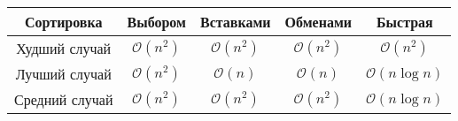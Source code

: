 \begin{tabular}{|c|c|c|c|c|}
    \hline
     Сортировка & Выбором & Вставками & Обменами & Быстрая \\
     \hline
     Худший случай & $\mathcal{O}(n^2)$ & $\mathcal{O}(n^2)$ & $\mathcal{O}(n^2)$ & $\mathcal{O}(n^2)$ \\
     \hline
     Лучший случай & $\mathcal{O}(n^2)$ & $\mathcal{O}(n)$ & $\mathcal{O}(n)$ & $\mathcal{O}(n \log n)$ \\
     \hline
     Средний случай & $\mathcal{O}(n^2)$ & $\mathcal{O}(n^2)$ & $\mathcal{O}(n^2)$ & $\mathcal{O}(n \log n)$ \\
     \hline
\end{tabular}



